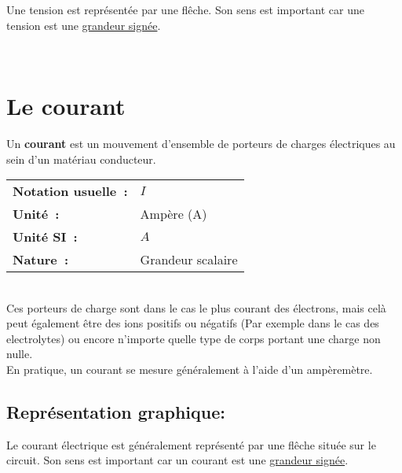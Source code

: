 \begin{minipage}{7cm}
	 
\end{minipage}
\hspace{1cm}
\begin{minipage}{7cm}
	Une tension est représentée par une flêche. Son sens est important car une tension est une \underline{grandeur signée}. 
\end{minipage}\\

\section{Le courant}

Un \textbf{courant} est un mouvement d'ensemble de porteurs de charges électriques au sein d'un matériau conducteur. \\

\begin{tabular}{ll}
\textbf{Notation usuelle~:} & $I$ \\
	\textbf{Unité~:} & Ampère (A) \\
\textbf{Unité SI~:} & $A$ \\
\textbf{Nature~:} & Grandeur scalaire \\
\end{tabular} \\

Ces porteurs de charge sont dans le cas le plus courant des électrons, mais celà peut également être des ions positifs ou négatifs (Par exemple dans le cas des electrolytes) ou encore n'importe quelle type de corps portant une charge non nulle. \\

En pratique, un courant se mesure généralement à l'aide d'un ampèremètre. 
\subsection*{ Représentation graphique: }

\begin{minipage}{7cm}
	 
\end{minipage}
\hspace{1cm}
\begin{minipage}{7cm}
	Le courant électrique est généralement représenté par une flêche située sur le circuit. Son sens est important car un courant est une \underline{grandeur signée}. 
\end{minipage}\\



